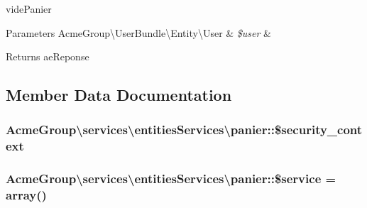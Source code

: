 vide\+Panier 
\begin{DoxyParams}[1]{Parameters}
Acme\+Group\textbackslash{}\+User\+Bundle\textbackslash{}\+Entity\textbackslash{}\+User & {\em \$user} & \\
\hline
\end{DoxyParams}
\begin{DoxyReturn}{Returns}
ae\+Reponse 
\end{DoxyReturn}


\subsection{Member Data Documentation}
\hypertarget{class_acme_group_1_1services_1_1entities_services_1_1panier_a0220572e247b7ef782e0a1053cbbea62}{
\subsubsection[{\$security\+\_\+context}]{\setlength{\rightskip}{0pt plus 5cm}Acme\+Group\textbackslash{}services\textbackslash{}entities\+Services\textbackslash{}panier\+::\$security\+\_\+context\hspace{0.3cm}{\ttfamily [protected]}}}\label{class_acme_group_1_1services_1_1entities_services_1_1panier_a0220572e247b7ef782e0a1053cbbea62}
\hypertarget{class_acme_group_1_1services_1_1entities_services_1_1panier_a0d2714ea86e1eda5a1993d1db8be0cea}{
\subsubsection[{\$service}]{\setlength{\rightskip}{0pt plus 5cm}Acme\+Group\textbackslash{}services\textbackslash{}entities\+Services\textbackslash{}panier\+::\$service = array()\hspace{0.3cm}{\ttfamily [protected]}}}\label{class_acme_group_1_1services_1_1entities_services_1_1panier_a0d2714ea86e1eda5a1993d1db8be0cea}

